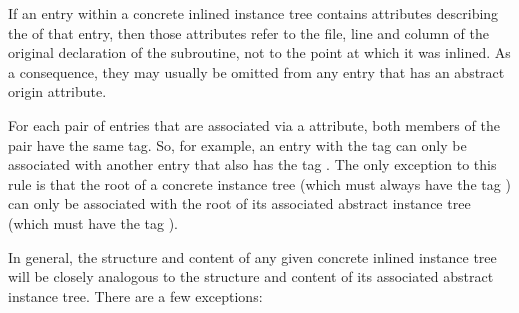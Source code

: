 If an entry within a concrete inlined instance tree contains
attributes describing the 
of that entry, then those attributes refer to the file, line
and column of the original declaration of the subroutine,
not to the point at which it was inlined. As a consequence,
they may usually be omitted from any entry that has an abstract
origin attribute.

For each pair of entries that are associated via a
\DWATabstractorigin{} attribute, both members of the pair
have the same tag. So, for example, an entry with the tag
\DWTAGvariable{} can only be associated with another entry
that also has the tag \DWTAGvariable. The only exception
to this rule is that the root of a concrete instance tree
(which must always have the tag \DWTAGinlinedsubroutine)
can only be associated with the root of its associated abstract
instance tree (which must have the tag \DWTAGsubprogram).

In general, the structure and content of any given concrete
inlined instance tree will be closely analogous to the
structure and content of its associated abstract instance
tree. There are a few exceptions:

